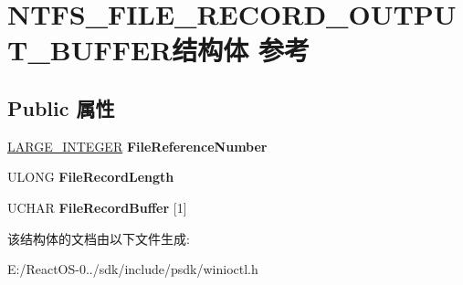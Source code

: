 \hypertarget{struct_n_t_f_s___f_i_l_e___r_e_c_o_r_d___o_u_t_p_u_t___b_u_f_f_e_r}{}\section{N\+T\+F\+S\+\_\+\+F\+I\+L\+E\+\_\+\+R\+E\+C\+O\+R\+D\+\_\+\+O\+U\+T\+P\+U\+T\+\_\+\+B\+U\+F\+F\+E\+R结构体 参考}
\label{struct_n_t_f_s___f_i_l_e___r_e_c_o_r_d___o_u_t_p_u_t___b_u_f_f_e_r}
\subsection*{Public 属性}
\begin{DoxyCompactItemize}
\item 
\mbox{\label{struct_n_t_f_s___f_i_l_e___r_e_c_o_r_d___o_u_t_p_u_t___b_u_f_f_e_r_a50229d331ed4cfe8f47b109890db9819}} 
\hyperlink{union___l_a_r_g_e___i_n_t_e_g_e_r}{L\+A\+R\+G\+E\+\_\+\+I\+N\+T\+E\+G\+ER} {\bfseries File\+Reference\+Number}
\item 
\mbox{\label{struct_n_t_f_s___f_i_l_e___r_e_c_o_r_d___o_u_t_p_u_t___b_u_f_f_e_r_a9dc91102b6cab77b91baa88051635ff9}} 
U\+L\+O\+NG {\bfseries File\+Record\+Length}
\item 
\mbox{\label{struct_n_t_f_s___f_i_l_e___r_e_c_o_r_d___o_u_t_p_u_t___b_u_f_f_e_r_a8afd6d03fe95be7c74a13306fd4a2c85}} 
U\+C\+H\+AR {\bfseries File\+Record\+Buffer} \mbox{[}1\mbox{]}
\end{DoxyCompactItemize}


该结构体的文档由以下文件生成\+:\begin{DoxyCompactItemize}
\item 
E\+:/\+React\+O\+S-\/0../sdk/include/psdk/winioctl.\+h\end{DoxyCompactItemize}
